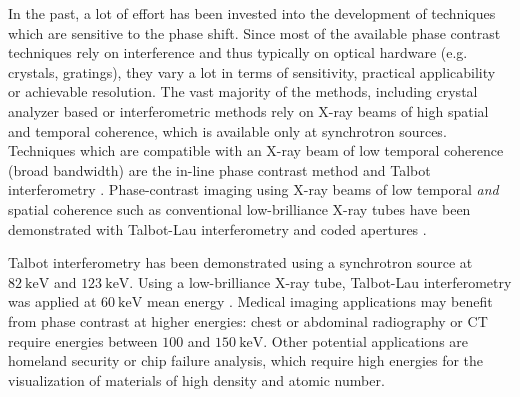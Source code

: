\documentclass[aps,prl,preprint]{revtex4-1}
\begin{document}
In the past, a lot of effort has been invested into the development of
techniques which are sensitive to the phase shift. Since most of the
available phase contrast techniques rely on interference and thus typically
on optical hardware (e.g. crystals, gratings), they vary a lot in terms of
sensitivity, practical applicability or achievable resolution. The vast
majority of the methods, including crystal analyzer based
\cite{Davis1995,Chapman1997} or interferometric \cite{Bonse1965,Momose1996}
methods rely on X-ray beams of high spatial and temporal coherence, which is
available only at synchrotron sources. Techniques which are compatible with
an X-ray beam of low temporal coherence (broad bandwidth) are the in-line
phase contrast method \cite{Snigirev1995,Wilkins1996,Cloetens1996} and
Talbot interferometry \cite{Cloetens1997,David2002,Momose2003a}.
Phase-contrast imaging using X-ray beams of low temporal \emph{and}
spatial coherence such as conventional low-brilliance X-ray tubes have been
demonstrated with Talbot-Lau interferometry \cite{Pfeiffer2006} and coded
apertures \cite{Munro2012}.

Talbot interferometry has been demonstrated using a synchrotron source at
$\SI{82}{\kilo\electronvolt}$ \cite{Willner2013} and
$\SI{123}{\kilo\electronvolt}$\cite{Ruiz2013}.
Using a low-brilliance X-ray tube, Talbot-Lau interferometry was
applied at $\SI{60}{\kilo\electronvolt}$ mean energy \cite{Donath2009}.
Medical imaging applications may benefit from phase contrast at higher
energies: chest or abdominal
radiography or \ac{CT} require energies between $100$ and
$\SI{150}{\kilo\electronvolt}$. Other potential applications are homeland
security or chip failure analysis, which require high energies for the
visualization of materials of high density and atomic number.
\end{document}
